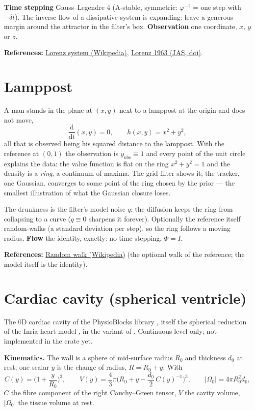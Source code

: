 \documentclass[11pt,a4paper]{article}
\newcommand{\modelsection}[2]{\clearpage\hypertarget{#1}{}\section{#2}\label{model:#1}}
\begin{document}
\textbf{Time stepping} Gauss--Legendre 4 (A-stable, symmetric: $\varphi^{-1}$ = one step with $-\delta t$). The inverse flow of a dissipative system is expanding: leave a generous margin around the attractor in the filter's box. \textbf{Observation} one coordinate, $x$, $y$ or $z$.

\textbf{References:} \href{https://en.wikipedia.org/wiki/Lorenz_system}{Lorenz system (Wikipedia)}, \href{https://doi.org/10.1175/1520-0469(1963)020\%3C0130:DNF\%3E2.0.CO;2}{Lorenz 1963 (JAS, doi)}.

\modelsection{lamppost}{Lamppost}
A man stands in the plane at $(x,y)$ next to a lamppost at the origin and does not move,
\[
  \frac{\mathrm d}{\mathrm dt}(x,y)=0, \qquad h(x,y)=x^2+y^2 ,
\]
all that is observed being his squared distance to the lamppost. With the reference at $(0,1)$ the observation is $y_{\text{obs}}\equiv1$ and every point of the unit circle explains the data: the value function is flat on the ring $x^2+y^2=1$ and the density is a \emph{ring}, a continuum of maxima. The grid filter shows it; the tracker, one Gaussian, converges to some point of the ring chosen by the prior — the smallest illustration of what the Gaussian closure loses.

The drunkness is the filter's model noise $q$: the diffusion keeps the ring from collapsing to a curve ($q\equiv0$ sharpens it forever). Optionally the reference itself random-walks (a standard deviation per step), so the ring follows a moving radius. \textbf{Flow} the identity, exactly: no time stepping, $\Phi=I$.

\textbf{References:} \href{https://en.wikipedia.org/wiki/Random_walk}{Random walk (Wikipedia)} (the optional walk of the reference; the model itself is the identity).

\modelsection{cavity}{Cardiac cavity (spherical ventricle)}
The 0D cardiac cavity of the PhysioBlocks library \cite[Appendix~C]{physioblocks}, itself the spherical reduction \cite{caruel2014} of the Inria heart model \cite{chapelle2012}, in the variant of \cite{manganotti2021}. Continuous level only; not implemented in the crate yet.

\textbf{Kinematics.} The wall is a sphere of mid-surface radius $R_0$ and thickness $d_0$ at rest; one scalar $y$ is the change of radius, $R=R_0+y$. With
\[
  C(y)=\Big(1+\frac{y}{R_0}\Big)^2, \qquad
  V(y)=\frac43\pi\Big(R_0+y-\frac{d_0}{2}\,C(y)^{-1}\Big)^3, \qquad
  |\Omega_0|=4\pi R_0^2d_0 ,
\]
$C$ the fibre component of the right Cauchy--Green tensor, $V$ the cavity volume, $|\Omega_0|$ the tissue volume at rest.
\end{document}

